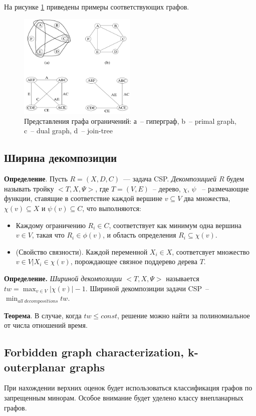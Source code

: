 \documentclass[12pt]{article}
\begin{document}
На рисунке \ref{fig:constraint_graph} приведены примеры соответствующих графов.

\begin{figure}[htb]
\centering
\includegraphics[width=0.50\textwidth]{constraint_graph.png}
\caption{Представления графа ограничений: а~-- гиперграф, b~-- primal graph, c~-- dual graph, d~-- join-tree }
\label{fig:constraint_graph}
\end{figure}


\subsection{Ширина декомпозиции}
\textbf{Определение}. Пусть $R = (X, D, C)$~--- задача CSP. \textit{Декомпозицией $R$} 
будем называть тройку $< T, X, \Psi >$, где $T = (V, E)$~-- дерево, $\chi$, $\psi$ ~-- 
размечающие функции, ставящие в соответствие каждой вершине $v \subseteq V$ два множества, $\chi(v) \subseteq X$
и $\psi(v) \subseteq C$, что выполняются:
\begin{itemize}
\item Каждому ограничению $R_i \in C$, соответствует как минимум одна вершина $v \in V$,
такая что $R_i \in \phi(v)$, и область определения $R_i \subseteq \chi(v)$.
\item (Свойство связности). 
Каждой переменной $X_i \in X$, соответсвует множество ${v \in V |X_i \in \chi(v)}$, порождающее
связное поддерево дерева $T$. 
\end{itemize}

\textbf{Определение.}
\textit{Шириной декомпозиции $ < T, X, \Psi >$} называется $tw = \max_{v \in V}{|\chi(v)| - 1}$.
Шириной декомпозиции задачи CSP~-- $\min_{all~decompositions}{tw}$.


\textbf{Теорема}. В случае, когда $tw \leq const$, 
решение можно найти за полиномиальное от числа отношений время. \cite{CSP10}

\subsection{Forbidden graph characterization, k-outerplanar graphs}
При нахождении верхних оценок будет использоваться классификация графов по запрещенным минорам.
Особое внимание будет уделено классу внепланарных графов.
\end{document}
